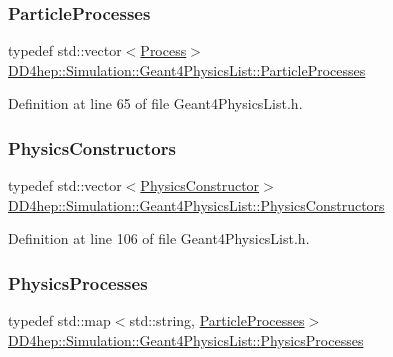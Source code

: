 \subsubsection{\texorpdfstring{Particle\+Processes}{ParticleProcesses}}
{\footnotesize\ttfamily typedef std\+::vector$<$\hyperlink{class_d_d4hep_1_1_simulation_1_1_geant4_physics_list_1_1_process}{Process}$>$ \hyperlink{class_d_d4hep_1_1_simulation_1_1_geant4_physics_list_adf5c4ae6ed4befac883cf5f253f4220e}{D\+D4hep\+::\+Simulation\+::\+Geant4\+Physics\+List\+::\+Particle\+Processes}}



Definition at line 65 of file Geant4\+Physics\+List.\+h.

\hypertarget{class_d_d4hep_1_1_simulation_1_1_geant4_physics_list_a5953826b626c21fa4b26ab9a07f3b8ad}{}\label{class_d_d4hep_1_1_simulation_1_1_geant4_physics_list_a5953826b626c21fa4b26ab9a07f3b8ad} 
\subsubsection{\texorpdfstring{Physics\+Constructors}{PhysicsConstructors}}
{\footnotesize\ttfamily typedef std\+::vector$<$\hyperlink{class_d_d4hep_1_1_simulation_1_1_geant4_physics_list_1_1_physics_constructor}{Physics\+Constructor}$>$ \hyperlink{class_d_d4hep_1_1_simulation_1_1_geant4_physics_list_a5953826b626c21fa4b26ab9a07f3b8ad}{D\+D4hep\+::\+Simulation\+::\+Geant4\+Physics\+List\+::\+Physics\+Constructors}}



Definition at line 106 of file Geant4\+Physics\+List.\+h.

\hypertarget{class_d_d4hep_1_1_simulation_1_1_geant4_physics_list_ab41e55687c9d57878fe2e6847a31f19a}{}\label{class_d_d4hep_1_1_simulation_1_1_geant4_physics_list_ab41e55687c9d57878fe2e6847a31f19a} 
\subsubsection{\texorpdfstring{Physics\+Processes}{PhysicsProcesses}}
{\footnotesize\ttfamily typedef std\+::map$<$std\+::string, \hyperlink{class_d_d4hep_1_1_simulation_1_1_geant4_physics_list_adf5c4ae6ed4befac883cf5f253f4220e}{Particle\+Processes}$>$ \hyperlink{class_d_d4hep_1_1_simulation_1_1_geant4_physics_list_ab41e55687c9d57878fe2e6847a31f19a}{D\+D4hep\+::\+Simulation\+::\+Geant4\+Physics\+List\+::\+Physics\+Processes}}



